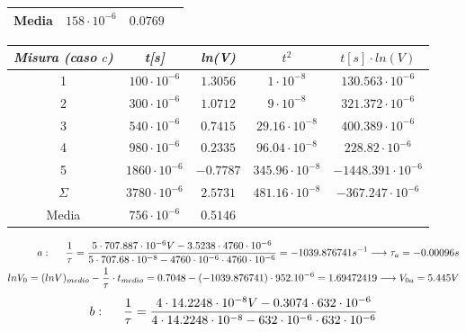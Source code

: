 \begin{center}
\begin{tabular}{|c|c|c|c|c|}
        \hline
        Media & $158 \cdot 10^{-6}$ & $0.0769$ & \multicolumn{2}{c}{} \\
        \hline
    \end{tabular}
    \begin{tabular}{|c|c|c|c|c|}
        \hline
        \textit{Misura (caso $c$)} & \textit{t[s]} & \textit{ln(V)} & \textit{$t^2$} & \textit{$t[s] \cdot ln(V)$} \\
        \hline
        1 & $100 \cdot 10^{-6}$ & $1.3056$ & $1 \cdot 10^{-8}$ & $130.563 \cdot 10^{-6}$ \\
        \hline
        2 & $300 \cdot 10^{-6}$ & $1.0712$ & $9 \cdot 10^{-8}$ & $321.372 \cdot 10^{-6}$ \\
        \hline
        3 & $540 \cdot 10^{-6}$ & $0.7415$ & $29.16 \cdot 10^{-8}$ & $400.389 \cdot 10^{-6}$ \\
        \hline
        4 & $980 \cdot 10^{-6}$ & $0.2335$ & $96.04 \cdot 10^{-8}$ & $228.82 \cdot 10^{-6}$ \\
        \hline
        5 & $1860 \cdot 10^{-6}$ & $-0.7787$ & $345.96 \cdot 10^{-8}$ & $-1448.391 \cdot 10^{-6}$ \\
        \hline
        $\varSigma$ & $3780 \cdot 10^{-6}$ & $2.5731$ & $481.16 \cdot 10^{-8}$ & $-367.247 \cdot 10^{-6}$ \\
        \hline
        Media & $756 \cdot 10^{-6}$ & $0.5146$ & \multicolumn{2}{c}{} \\
        \hline
    \end{tabular}
    \begin{equation}
        \begin{split}
            a: \hspace{0.5 cm}\frac{1}{\tau} = \frac{5 \cdot 707.887\cdot10^{-6}V - 3.5238\cdot4760\cdot10^{-6}}{5\cdot707.68\cdot10^{-8} - 4760\cdot10^{-6}\cdot4760\cdot10^{-6}}
            = -1039.876741s^{-1} \longrightarrow \tau_a = -0.00096s
            \\
            ln{V_0} = (ln{V})_{medio} - \frac{1}{\tau}\cdot t_{medio} = 0.7048 - (-1039.876741)\cdot952.10^{-6} = 1.69472419 \longrightarrow V_{0a} = 5.445V
        \end{split}
    \end{equation}
    \begin{equation}
        \begin{split}
            b : \hspace{0.5 cm}\frac{1}{\tau} = \frac{4 \cdot 14.2248\cdot10^{-8}V - 0.3074\cdot632\cdot10^{-6}}{4\cdot14.2248\cdot10^{-8} - 632\cdot10^{-6}\cdot632\cdot10^{-6}}

\end{split}
\end{equation}
\end{center}
